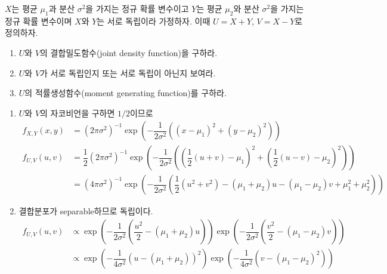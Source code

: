 \documentclass[answers]{exam}
\begin{document}
\newpage
{}
\begin{questions}
   \question
   $X$는 평균 $\mu_{1}$과 분산 $\sigma^{2}$을 가지는 정규 확률 변수이고 $Y$는 평균 $\mu_{2}$와 분산 $\sigma^{2}$을 가지는 정규 확률 변수이며 $X$와 $Y$는 서로 독립이라 가정하자. 이때 $U=X+Y$, $V=X-Y$로 정의하자.
   \begin{enumerate}
      \item $U$와 $V$의 결합밀도함수(joint density function)을 구하라.
      \item $U$와 $V$가 서로 독립인지 또는 서로 독립이 아닌지 보여라.
      \item $U$의 적률생성함수(moment generating function)를 구하라.
   \end{enumerate}
   \begin{solution}
    \begin{enumerate}
      \item $U$와 $V$의 자코비언을 구하면 $1/2$이므로
      \begin{align}
        f_{X,Y}\left(x,y\right) &= \left(2\pi\sigma^{2}\right)^{-1}\exp\left(-\dfrac{1}{2\sigma^{2}}\left(\left(x-\mu_{1}\right)^{2}+\left(y-\mu_{2}\right)^{2}\right)\right)\\
        f_{U,V}\left(u,v\right) &= \dfrac{1}{2}\left(2\pi\sigma^{2}\right)^{-1}\exp\left(-\dfrac{1}{2\sigma^{2}}\left(\left(\dfrac{1}{2}\left(u+v\right)-\mu_{1}\right)^{2}+\left(\dfrac{1}{2}\left(u-v\right)-\mu_{2}\right)^{2}\right)\right)\\
        &= \left(4\pi\sigma^{2}\right)^{-1}\exp\left(-\dfrac{1}{2\sigma^{2}}\left(\dfrac{1}{2}\left(u^{2}+v^{2}\right)-\left(\mu_{1}+\mu_{2}\right)u-\left(\mu_{1}-\mu_{2}\right)v+\mu_{1}^{2}+\mu_{2}^{2}\right)\right)
      \end{align}
      \item 결합분포가 separable하므로 독립이다.
      \begin{align}
        f_{U,V}\left(u,v\right) &\propto \exp\left(-\dfrac{1}{2\sigma^{2}}\left(\dfrac{u^{2}}{2}-\left(\mu_{1}+\mu_{2}\right)u\right)\right)\exp\left(-\dfrac{1}{2\sigma^{2}}\left(\dfrac{v^{2}}{2}-\left(\mu_{1}-\mu_{2}\right)v\right)\right)\\
        &\propto \exp\left(-\dfrac{1}{4\sigma^{2}}\left(u-\left(\mu_{1}+\mu_{2}\right)\right)^{2}\right)\exp\left(-\dfrac{1}{4\sigma^{2}}\left(v-\left(\mu_{1}-\mu_{2}\right)^{2}\right)\right)\\

\end{align}
\end{enumerate}
\end{solution}
\end{questions}
\end{document}

